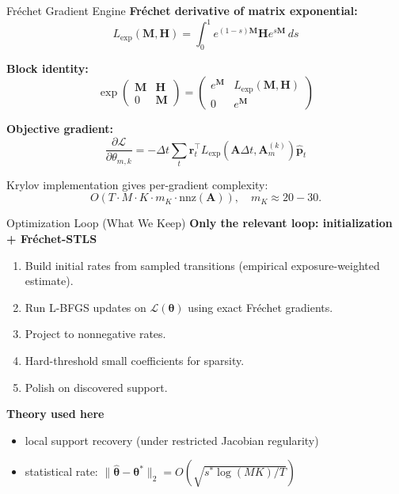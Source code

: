 \documentclass[10pt,aspectratio=169]{beamer}
\newcommand{\bA}{\mathbf{A}}
\newcommand{\bM}{\mathbf{M}}
\newcommand{\bp}{\mathbf{p}}
\newcommand{\br}{\mathbf{r}}
\newcommand{\bH}{\mathbf{H}}
\newcommand{\btheta}{\bm{\theta}}
\newcommand{\cL}{\mathcal{L}}
\begin{document}
\begin{frame}{Fr\'{e}chet Gradient Engine}
\textbf{Fr\'{e}chet derivative of matrix exponential:}
\[
L_{\exp}(\bM,\bH)=\int_0^1 e^{(1-s)\bM}\bH e^{s\bM}\,ds
\]

\vspace{0.3em}
\textbf{Block identity:}
\[
\exp\!\begin{pmatrix}\bM&\bH\\0&\bM\end{pmatrix}
=
\begin{pmatrix}e^{\bM}&L_{\exp}(\bM,\bH)\\0&e^{\bM}\end{pmatrix}
\]

\vspace{0.3em}
\textbf{Objective gradient:}
\[
\frac{\partial \cL}{\partial \theta_{m,k}}
=
-\Delta t\sum_t
\br_t^\top
L_{\exp}\!\left(\bA\Delta t,\bA_m^{(k)}\right)\hat{\bp}_t
\]

\vspace{0.3em}
Krylov implementation gives per-gradient complexity:
\[
O\!\left(T\cdot M\cdot K\cdot m_K\cdot \mathrm{nnz}(\bA)\right),\quad m_K\approx 20\!-\!30.
\]
\end{frame}

\begin{frame}{Optimization Loop (What We Keep)}
\textbf{Only the relevant loop: initialization + Fr\'{e}chet-STLS}
\begin{enumerate}
    \item Build initial rates from sampled transitions (empirical exposure-weighted estimate).
    \item Run L-BFGS updates on $\cL(\btheta)$ using exact Fr\'{e}chet gradients.
    \item Project to nonnegative rates.
    \item Hard-threshold small coefficients for sparsity.
    \item Polish on discovered support.
\end{enumerate}

\vspace{0.4em}
\textbf{Theory used here}
\begin{itemize}
    \item local support recovery (under restricted Jacobian regularity)
    \item statistical rate: $\|\hat{\btheta}-\btheta^*\|_2=O\!\left(\sqrt{s^*\log(MK)/T}\right)$
\end{itemize}
\end{frame}
\end{document}
